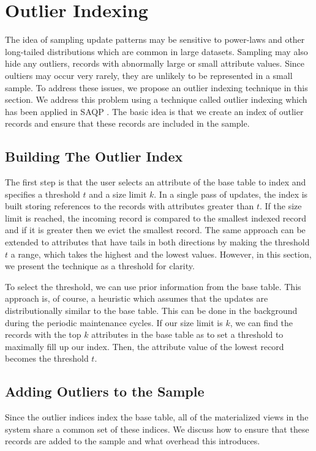 \section{Outlier Indexing}\label{outlier}
The idea of sampling update patterns may be sensitive to power-laws and other long-tailed distributions which are common in large datasets\cite{clauset2009power}.
Sampling may also hide any outliers, records with abnormally large or small attribute values.
Since oultiers may occur very rarely, they are unlikely to be represented in a small sample. To address these issues, we propose an outlier indexing technique in this section. 
We address this problem using a technique called outlier indexing which has been applied in SAQP \cite{chaudhuri2001overcoming}.
The basic idea is that we create an index of outlier records and ensure that these records are included in the sample.

\subsection{Building The Outlier Index}
The first step is that the user selects an attribute of the base table to index and specifies a threshold $t$ and a size limit $k$.
In a single pass of updates, the index is built storing references to the records with attributes greater than $t$.
If the size limit is reached, the incoming record is compared to the smallest indexed record and if it is greater then we evict the smallest record.
The same approach can be extended to attributes that have tails in both directions by making the threshold $t$ a range, which takes the highest and the lowest values.
However, in this section, we present the technique as a threshold for clarity.

To select the threshold, we can use prior information from the base table.
This approach is, of course, a heuristic which assumes that the updates are distributionally similar to the 
base table. 
This can be done in the background during the periodic maintenance cycles.
If our size limit is $k$, we can find the records with the top $k$ attributes in the base table as to set a threshold to maximally fill up our index. 
Then, the attribute value of the lowest record becomes the threshold $t$.

\subsection{Adding Outliers to the Sample}
Since the outlier indices index the base table, all of the materialized views in the system share a common set of these indices.
We discuss how to ensure that these records are added to the sample and what overhead this introduces.

